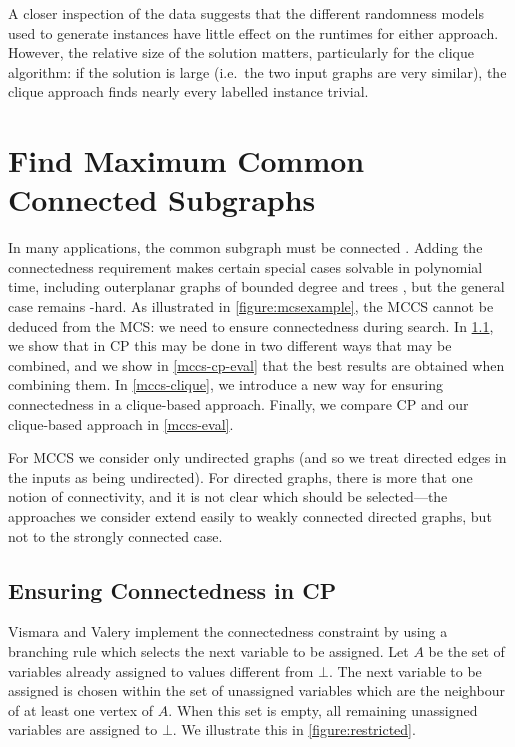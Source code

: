 \documentclass{llncs}
\begin{document}
A closer inspection of the data suggests that the different randomness models used to generate
instances have little effect on the runtimes for either approach. However, the relative size of the
solution matters, particularly for the clique algorithm: if the solution is large (i.e.\ the two
input graphs are very similar), the clique approach finds nearly every labelled instance trivial.

\section{Find Maximum Common Connected Subgraphs}\label{mccs}

In many applications, the common subgraph must be connected
\cite{DBLP:journals/tcs/Koch01,DBLP:journals/jcamd/RaymondW02a,DBLP:conf/mco/VismaraV08,Ehrlich:2011}.
Adding the connectedness requirement makes certain special cases solvable in polynomial time,
including outerplanar graphs of bounded degree \cite{DBLP:journals/algorithms/AkutsuT13} and trees
\cite{DBLP:journals/corr/DroschinskyKM16}, but the general case remains \NP-hard. As illustrated in
\cref{figure:mcsexample}, the MCCS cannot be deduced from the MCS: we need to ensure connectedness
during search. In \cref{mccs-cp}, we show that in CP this may be done in two different ways that
may be combined, and we show in \cref{mccs-cp-eval} that the best results are obtained when
combining them. In \cref{mccs-clique}, we introduce a new way for ensuring connectedness in a
clique-based approach. Finally, we compare CP and our clique-based approach in \cref{mccs-eval}.

For MCCS we consider only undirected graphs (and so we treat directed edges in the inputs as being
undirected). For directed graphs, there is more that one notion of connectivity, and it is not clear
which should be selected---the approaches we consider extend easily to weakly connected directed
graphs, but not to the strongly connected case.

\subsection{Ensuring Connectedness in CP}\label{mccs-cp}

Vismara and Valery \cite{DBLP:conf/mco/VismaraV08} implement the connectedness constraint by using a
branching rule which selects the next variable to be assigned. Let $A$ be the
set of variables already assigned to values different from $\bot$. The next variable to be assigned
is chosen within the set of unassigned variables which are the neighbour of at least one vertex of
$A$.  When this set is empty, all remaining unassigned variables are assigned to
$\bot$. We illustrate this in \cref{figure:restricted}.
\end{document}
